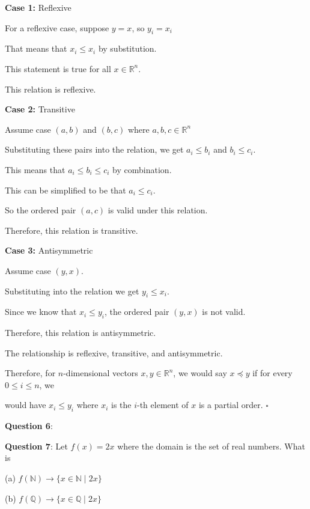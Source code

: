 \documentclass{article} %
\newcommand{\question}[2][]{\begin{flushleft}
        \textbf{Question #1}: #2
\end{flushleft}}
\begin{document}
    \textbf{Case 1:} Reflexive

    \tabto{1cm} For a reflexive case, suppose $y = x$, so $y_i = x_i$

    \tabto{1cm} That means that $x_i \leq x_i$ by substitution. 

    \tabto{1cm} This statement is true for all $x \in \mathbb{R}^n$.

    \tabto{1cm} This relation is reflexive.

    \textbf{Case 2:} Transitive

    \tabto{1cm} Assume case $(a, b)$ and $(b, c)$ where $a, b, c \in \mathbb{R}^n$ 

    \tabto{1cm} Substituting these pairs into the relation, we get $a_i \leq b_i$ and $b_i \leq c_i$.

    \tabto{1cm} This means that $a_i \leq b_i \leq c_i$ by combination.

    \tabto{1cm} This can be simplified to be that $a_i \leq c_i$.

    \tabto{1cm} So the ordered pair $(a, c)$ is valid under this relation.

    \tabto{1cm} Therefore, this relation is transitive.

    \textbf{Case 3:} Antisymmetric

    \tabto{1cm} Assume case $(y, x)$.

    \tabto{1cm} Substituting into the relation we get $y_i \leq x_i$.

    \tabto{1cm} Since we know that $x_i \leq y_i$, the ordered pair $(y, x)$ is not valid.

    \tabto{1cm} Therefore, this relation is antisymmetric.

    The relationship is reflexive, transitive, and antisymmetric.

    Therefore, for $n$-dimensional vectors $x, y \in \mathbb{R}^n$, we would say $x \preceq y$ if for every $0 \leq i \leq n$, we
    
    
        would have $x_i \leq y_i$ where $x_i$ is the $i$-th element of $x$ is a partial order. $\square$





    \question[6]{}

    \question[7]{Let $f(x) = 2x$ where the domain is the set of real numbers. What is}

    (a) $f(\mathbb{N}) \rightarrow \{ x \in \mathbb{N} \mid 2x \}$

    (b) $f(\mathbb{Q}) \rightarrow \{ x \in \mathbb{Q} \mid 2x \}$
\end{document}

